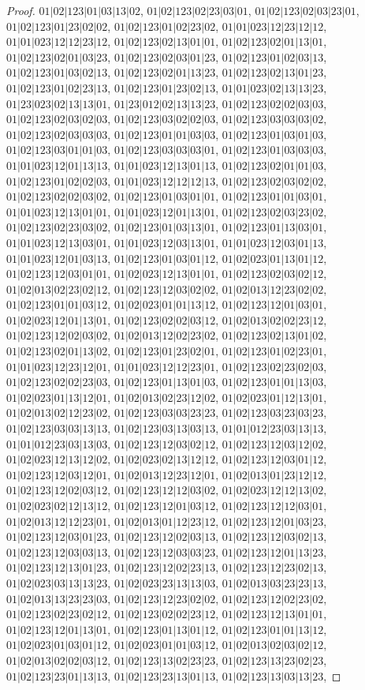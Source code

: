 \documentclass[12pt]{article}
\theoremstyle{plain}
\theoremstyle{definition}
\theoremstyle{remark}
\begin{document}
\begin{proof}
$01|02|123|01|03|13|02$, $01|02|123|02|23|03|01$, $01|02|123|02|03|23|01$, $01|02|123|01|23|02|02$, $01|02|123|01|02|23|02$, $01|01|023|12|23|12|12$, $01|01|023|12|12|23|12$, $01|02|123|02|13|01|01$, $01|02|123|02|01|13|01$, $01|02|123|02|01|03|23$, $01|02|123|02|03|01|23$, $01|02|123|01|02|03|13$, $01|02|123|01|03|02|13$, $01|02|123|02|01|13|23$, $01|02|123|02|13|01|23$, $01|02|123|01|02|23|13$, $01|02|123|01|23|02|13$, $01|01|023|02|13|13|23$, $01|23|023|02|13|13|01$, $01|23|012|02|13|13|23$, $01|02|123|02|02|03|03$, $01|02|123|02|03|02|03$, $01|02|123|03|02|02|03$, $01|02|123|03|03|03|02$, $01|02|123|02|03|03|03$, $01|02|123|01|01|03|03$, $01|02|123|01|03|01|03$, $01|02|123|03|01|01|03$, $01|02|123|03|03|03|01$, $01|02|123|01|03|03|03$, $01|01|023|12|01|13|13$, $01|01|023|12|13|01|13$, $01|02|123|02|01|01|03$, $01|02|123|01|02|02|03$, $01|01|023|12|12|12|13$, $01|02|123|02|03|02|02$, $01|02|123|02|02|03|02$, $01|02|123|01|03|01|01$, $01|02|123|01|01|03|01$, $01|01|023|12|13|01|01$, $01|01|023|12|01|13|01$, $01|02|123|02|03|23|02$, $01|02|123|02|23|03|02$, $01|02|123|01|03|13|01$, $01|02|123|01|13|03|01$, $01|01|023|12|13|03|01$, $01|01|023|12|03|13|01$, $01|01|023|12|03|01|13$, $01|01|023|12|01|03|13$, $01|02|123|01|03|01|12$, $01|02|023|01|13|01|12$, $01|02|123|12|03|01|01$, $01|02|023|12|13|01|01$, $01|02|123|02|03|02|12$, $01|02|013|02|23|02|12$, $01|02|123|12|03|02|02$, $01|02|013|12|23|02|02$, $01|02|123|01|01|03|12$, $01|02|023|01|01|13|12$, $01|02|123|12|01|03|01$, $01|02|023|12|01|13|01$, $01|02|123|02|02|03|12$, $01|02|013|02|02|23|12$, $01|02|123|12|02|03|02$, $01|02|013|12|02|23|02$, $01|02|123|02|13|01|02$, $01|02|123|02|01|13|02$, $01|02|123|01|23|02|01$, $01|02|123|01|02|23|01$, $01|01|023|12|23|12|01$, $01|01|023|12|12|23|01$, $01|02|123|02|23|02|03$, $01|02|123|02|02|23|03$, $01|02|123|01|13|01|03$, $01|02|123|01|01|13|03$, $01|02|023|01|13|12|01$, $01|02|013|02|23|12|02$, $01|02|023|01|12|13|01$, $01|02|013|02|12|23|02$, $01|02|123|03|03|23|23$, $01|02|123|03|23|03|23$, $01|02|123|03|03|13|13$, $01|02|123|03|13|03|13$, $01|01|012|23|03|13|13$, $01|01|012|23|03|13|03$, $01|02|123|12|03|02|12$, $01|02|123|12|03|12|02$, $01|02|023|12|13|12|02$, $01|02|023|02|13|12|12$, $01|02|123|12|03|01|12$, $01|02|123|12|03|12|01$, $01|02|013|12|23|12|01$, $01|02|013|01|23|12|12$, $01|02|123|12|02|03|12$, $01|02|123|12|12|03|02$, $01|02|023|12|12|13|02$, $01|02|023|02|12|13|12$, $01|02|123|12|01|03|12$, $01|02|123|12|12|03|01$, $01|02|013|12|12|23|01$, $01|02|013|01|12|23|12$, $01|02|123|12|01|03|23$, $01|02|123|12|03|01|23$, $01|02|123|12|02|03|13$, $01|02|123|12|03|02|13$, $01|02|123|12|03|03|13$, $01|02|123|12|03|03|23$, $01|02|123|12|01|13|23$, $01|02|123|12|13|01|23$, $01|02|123|12|02|23|13$, $01|02|123|12|23|02|13$, $01|02|023|03|13|13|23$, $01|02|023|23|13|13|03$, $01|02|013|03|23|23|13$, $01|02|013|13|23|23|03$, $01|02|123|12|23|02|02$, $01|02|123|12|02|23|02$, $01|02|123|02|23|02|12$, $01|02|123|02|02|23|12$, $01|02|123|12|13|01|01$, $01|02|123|12|01|13|01$, $01|02|123|01|13|01|12$, $01|02|123|01|01|13|12$, $01|02|023|01|03|01|12$, $01|02|023|01|01|03|12$, $01|02|013|02|03|02|12$, $01|02|013|02|02|03|12$, $01|02|123|13|02|23|23$, $01|02|123|13|23|02|23$, $01|02|123|23|01|13|13$, $01|02|123|23|13|01|13$, $01|02|123|13|03|13|23$, 
\end{proof}
\end{document}
